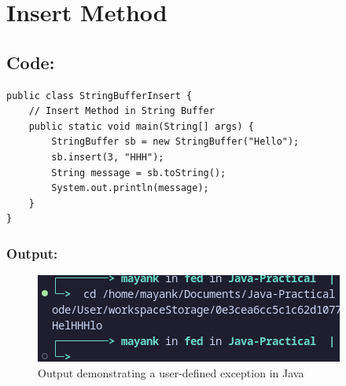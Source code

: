 \documentclass[a4paper,12pt]{article}
\begin{document}
\section{Insert Method}
\subsection{Code:}
\begin{lstlisting}
public class StringBufferInsert {
    // Insert Method in String Buffer
    public static void main(String[] args) {
        StringBuffer sb = new StringBuffer("Hello");
        sb.insert(3, "HHH");
        String message = sb.toString();
        System.out.println(message);
    }
}
\end{lstlisting}

\subsubsection{Output:}
\begin{figure}[H]
    \centering
    \includegraphics[width=0.8\linewidth]{images/42.png}
    \caption{Output demonstrating a user-defined exception in Java}
\end{figure}
\end{document}
